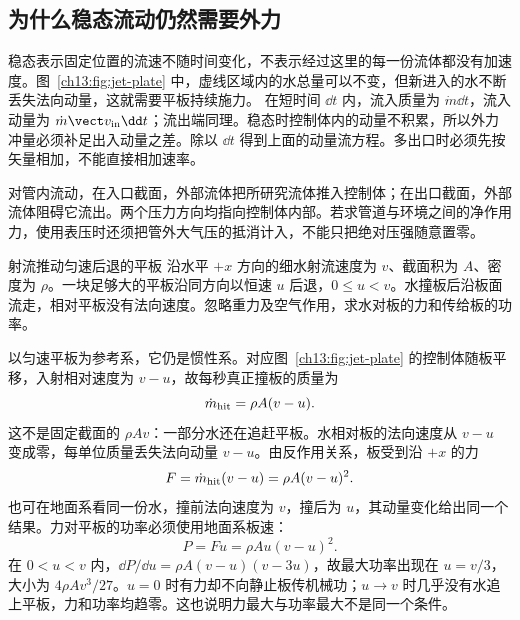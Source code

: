 \subsection{为什么稳态流动仍然需要外力}
稳态表示固定位置的流速不随时间变化，不表示经过这里的每一份流体都没有加速度。图~\ref{ch13:fig:jet-plate} 中，虚线区域内的水总量可以不变，但新进入的水不断丢失法向动量，这就需要平板持续施力。
在短时间 $\dd t$ 内，流入质量为 $\dot m\dd t$，流入动量为 $\dot m\vect v_{\rm in}\dd t$；流出端同理。稳态时控制体内的动量不积累，所以外力冲量必须补足出入动量之差。除以 $\dd t$ 得到上面的动量流方程。多出口时必须先按矢量相加，不能直接相加速率。

对管内流动，在入口截面，外部流体把所研究流体推入控制体；在出口截面，外部流体阻碍它流出。两个压力方向均指向控制体内部。若求管道与环境之间的净作用力，使用表压时还须把管外大气压的抵消计入，不能只把绝对压强随意置零。

\begin{origexamplebox}{射流推动匀速后退的平板}\label{ch13:ex:teaching-moving-plate}
沿水平 $+x$ 方向的细水射流速度为 $v$、截面积为 $A$、密度为 $\rho$。一块足够大的平板沿同方向以恒速 $u$ 后退，$0\le u<v$。水撞板后沿板面流走，相对平板没有法向速度。忽略重力及空气作用，求水对板的力和传给板的功率。
\end{origexamplebox}
\begin{xesolution}
以匀速平板为参考系，它仍是惯性系。对应图~\ref{ch13:fig:jet-plate} 的控制体随板平移，入射相对速度为 $v-u$，故每秒真正撞板的质量为
\[
 \dot m_{\rm hit}=\rho A(v-u).
\]
这不是固定截面的 $\rho Av$：一部分水还在追赶平板。水相对板的法向速度从 $v-u$ 变成零，每单位质量丢失法向动量 $v-u$。由反作用关系，板受到沿 $+x$ 的力
\[
 F=\dot m_{\rm hit}(v-u)=\rho A(v-u)^2.
\]
也可在地面系看同一份水，撞前法向速度为 $v$，撞后为 $u$，其动量变化给出同一个结果。力对平板的功率必须使用地面系板速：
\[
 P=Fu=\rho Au(v-u)^2.
\]
在 $0<u<v$ 内，$\dd P/\dd u=\rho A(v-u)(v-3u)$，故最大功率出现在 $u=v/3$，大小为 $4\rho Av^3/27$。$u=0$ 时有力却不向静止板传机械功；$u\to v$ 时几乎没有水追上平板，力和功率均趋零。这也说明力最大与功率最大不是同一个条件。
\end{xesolution}
